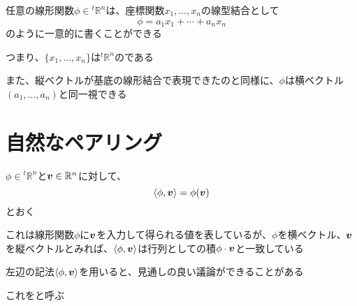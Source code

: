 \documentclass[../../../topic_linear-algebra]{subfiles}
\begin{document}
\br

任意の線形関数$\phi \in {}^t\mathbb{R}^n$は、座標関数$x_1,\dots,x_n$の線型結合として
\begin{equation*}
  \phi = a_1 x_1 + \cdots + a_n x_n
\end{equation*}
のように一意的に書くことができる

\br

つまり、$\{x_1,\dots,x_n\}$は${}^t\mathbb{R}^n$のである

\br

また、縦ベクトルが基底の線形結合で表現できたのと同様に、$\phi$は横ベクトル$(a_1,\dots,a_n)$と同一視できる

\sectionline
\section{自然なペアリング}

$\phi \in {}^t\mathbb{R}^n$と$\vb*{v} \in \mathbb{R}^n$に対して、
\begin{equation*}
  \langle \phi, \vb*{v} \rangle = \phi(\vb*{v})
\end{equation*}
とおく

\br

これは線形関数$\phi$に$\vb*{v}$を入力して得られる値を表しているが、$\phi$を横ベクトル、$\vb*{v}$を縦ベクトルとみれば、$\langle \phi, \vb*{v} \rangle$は行列としての積$\phi \cdot \vb*{v}$と一致している

\br

左辺の記法$\langle \phi, \vb*{v} \rangle$を用いると、見通しの良い議論ができることがある

これをと呼ぶ
\end{document}
